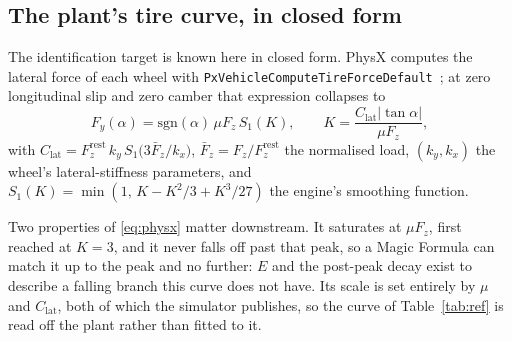 \subsection{The plant's tire curve, in closed form}
\label{subsec:planttire}

The identification target is known here in closed form.
PhysX computes the lateral force of each wheel with
\texttt{PxVehicle\-Compute\-Tire\-Force\-Default}~\cite{physxvehicle}; at zero
longitudinal slip and zero camber that expression collapses to
\begin{equation}
F_{y}(\alpha)=\mathrm{sgn}(\alpha)\,\mu F_{z}\,S_{1}(K),\qquad
K=\frac{C_{\mathrm{lat}}|\tan\alpha|}{\mu F_{z}},
\label{eq:physx}
\end{equation}
with $C_{\mathrm{lat}}=F_{z}^{\mathrm{rest}}\,k_{y}\,
S_{1}\!\big(3\bar F_{z}/k_{x}\big)$, $\bar F_{z}=F_{z}/F_{z}^{\mathrm{rest}}$
the normalised load, $(k_{y},k_{x})$ the wheel's lateral-stiffness parameters,
and $S_{1}(K)=\min(1,\,K-K^{2}/3+K^{3}/27)$ the engine's smoothing function.

Two properties of \eqref{eq:physx} matter downstream. It saturates at
$\mu F_{z}$, first reached at $K=3$, and it never falls off past that
peak, so a Magic Formula can match it up to the peak and no further: $E$ and
the post-peak decay exist to describe a falling branch this curve does not
have. Its
scale is set entirely by $\mu$ and $C_{\mathrm{lat}}$, both of which the
simulator publishes, so the curve of Table~\ref{tab:ref} is read off the plant
rather than fitted to it.


